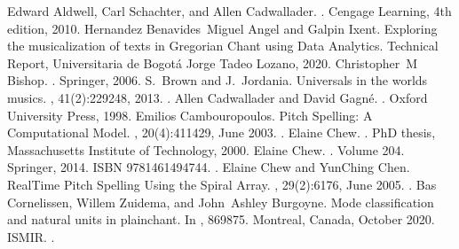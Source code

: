 \documentclass[letterpaper,10pt,english]{sphinxmanual}
\begin{document}
\begin{sphinxthebibliography}{10}
\sphinxAtStartPar
Edward Aldwell, Carl Schachter, and Allen Cadwallader. . Cengage Learning, 4th edition, 2010.
\sphinxAtStartPar
Hernandez Benavides Miguel Angel and Galpin Ixent. Exploring the musicalization of texts in Gregorian Chant using Data Analytics. Technical Report, Universitaria de Bogotá Jorge Tadeo Lozano, 2020.
\sphinxAtStartPar
Christopher M Bishop. . Springer, 2006.
\sphinxAtStartPar
S. Brown and J. Jordania. Universals in the world\textquotesingle{}s musics. , 41(2):229\textendash{}248, 2013. .
\sphinxAtStartPar
Allen Cadwallader and David Gagné. . Oxford University Press, 1998.
\sphinxAtStartPar
Emilios Cambouropoulos. Pitch Spelling: A Computational Model. , 20(4):411\textendash{}429, June 2003. .
\sphinxAtStartPar
Elaine Chew. . PhD thesis, Massachusetts Institute of Technology, 2000.
\sphinxAtStartPar
Elaine Chew. . Volume 204. Springer, 2014. ISBN 978\sphinxhyphen{}1\sphinxhyphen{}4614\sphinxhyphen{}9474\sphinxhyphen{}4. .
\sphinxAtStartPar
Elaine Chew and Yun\sphinxhyphen{}Ching Chen. Real\sphinxhyphen{}Time Pitch Spelling Using the Spiral Array. , 29(2):61\textendash{}76, June 2005. .
\sphinxAtStartPar
Bas Cornelissen, Willem Zuidema, and John Ashley Burgoyne. Mode classification and natural units in plainchant. In , 869\textendash{}875. Montreal, Canada, October 2020. ISMIR. .

\end{sphinxthebibliography}
\end{document}
